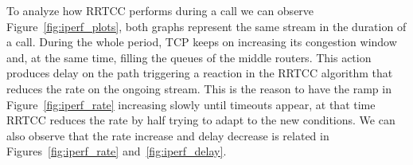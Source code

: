 

To analyze how RRTCC performs during a call we can observe Figure~\ref{fig:iperf_plots}, both graphs represent the same stream in the duration of a call. During the whole period, TCP keeps on increasing its congestion window and, at the same time, filling the queues of the middle routers. This action produces delay on the path triggering a reaction in the RRTCC algorithm that reduces the rate on the ongoing stream. This is the reason to have the ramp in Figure~\ref{fig:iperf_rate} increasing slowly until timeouts appear, at that time RRTCC reduces the rate by half trying to adapt to the new conditions. We can also observe that the rate increase and delay decrease is related in Figures~\ref{fig:iperf_rate} and~\ref{fig:iperf_delay}.

